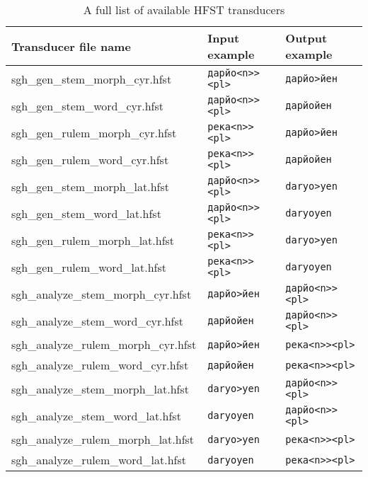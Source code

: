 \begin{table}[!h]
    \begin{center}
        \begin{tabular}{|l|l|l|}
            \hline
            \textbf{Transducer file name} & \textbf{Input example} & \textbf{Output example} \\
            \hline
            sgh\_gen\_stem\_morph\_cyr.hfst & \texttt{дарйо<n>><pl>} & \texttt{дарйо>йен} \\
            sgh\_gen\_stem\_word\_cyr.hfst & \texttt{дарйо<n>><pl>} & \texttt{дарйойен} \\
            sgh\_gen\_rulem\_morph\_cyr.hfst & \texttt{река<n>><pl>} & \texttt{дарйо>йен} \\
            sgh\_gen\_rulem\_word\_cyr.hfst & \texttt{река<n>><pl>} & \texttt{дарйойен} \\
            sgh\_gen\_stem\_morph\_lat.hfst & \texttt{дарйо<n>><pl>} & \texttt{daryo>yen} \\
            sgh\_gen\_stem\_word\_lat.hfst & \texttt{дарйо<n>><pl>} & \texttt{daryoyen} \\
            sgh\_gen\_rulem\_morph\_lat.hfst & \texttt{река<n>><pl>} & \texttt{daryo>yen} \\
            sgh\_gen\_rulem\_word\_lat.hfst & \texttt{река<n>><pl>} & \texttt{daryoyen} \\
            sgh\_analyze\_stem\_morph\_cyr.hfst & \texttt{дарйо>йен} & \texttt{дарйо<n>><pl>} \\
            sgh\_analyze\_stem\_word\_cyr.hfst & \texttt{дарйойен} & \texttt{дарйо<n>><pl>} \\
            sgh\_analyze\_rulem\_morph\_cyr.hfst & \texttt{дарйо>йен} & \texttt{река<n>><pl>} \\
            sgh\_analyze\_rulem\_word\_cyr.hfst & \texttt{дарйойен} & \texttt{река<n>><pl>} \\
            sgh\_analyze\_stem\_morph\_lat.hfst & \texttt{daryo>yen} & \texttt{дарйо<n>><pl>} \\
            sgh\_analyze\_stem\_word\_lat.hfst & \texttt{daryoyen} & \texttt{дарйо<n>><pl>} \\
            sgh\_analyze\_rulem\_morph\_lat.hfst & \texttt{daryo>yen} & \texttt{река<n>><pl>} \\
            sgh\_analyze\_rulem\_word\_lat.hfst & \texttt{daryoyen} & \texttt{река<n>><pl>} \\
            \hline
        \end{tabular}
        \caption{A full list of available HFST transducers}
        \label{Tab:all_hfst}
    \end{center}
\end{table}

